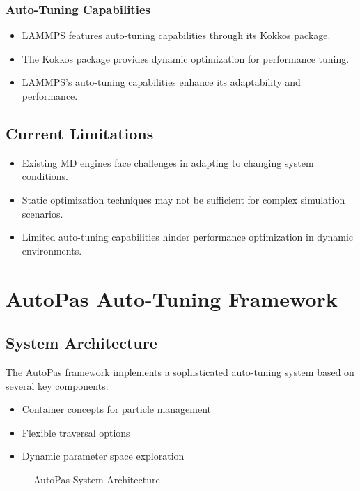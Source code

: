\documentclass[conference]{IEEEtran}
\begin{document}
\subsubsection{Auto-Tuning Capabilities}

\begin{itemize}
    \item LAMMPS features auto-tuning capabilities through its Kokkos package.
    \item The Kokkos package provides dynamic optimization for performance tuning.
    \item LAMMPS's auto-tuning capabilities enhance its adaptability and performance.
\end{itemize}


\subsection{Current Limitations}

\begin{itemize}
    \item Existing MD engines face challenges in adapting to changing system conditions.
    \item Static optimization techniques may not be sufficient for complex simulation scenarios.
    \item Limited auto-tuning capabilities hinder performance optimization in dynamic environments.
\end{itemize}


\section{AutoPas Auto-Tuning Framework}
\subsection{System Architecture}
The AutoPas framework implements a sophisticated auto-tuning system based on several key components:

\begin{itemize}
    \item Container concepts for particle management
    \item Flexible traversal options
    \item Dynamic parameter space exploration
\end{itemize}

\begin{figure}[!t]
    \centering
    \caption{AutoPas System Architecture}
    \label{fig_architecture}
\end{figure}
\end{document}
